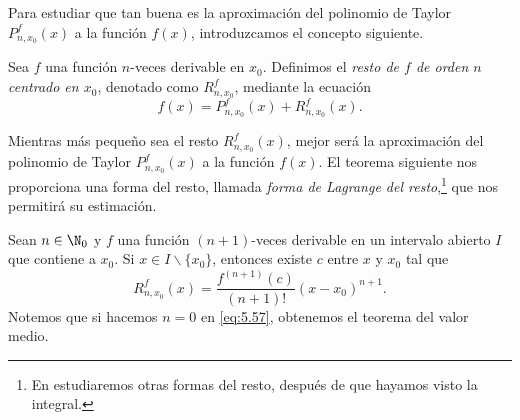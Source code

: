 \documentclass[12pt,a4paper]{book}
\begin{document}
    Para estudiar que tan buena es la aproximación del polinomio de Taylor
    $P^{f}_{n,x_{0}}(x)$ a la función $f(x)$, introduzcamos el concepto siguiente.

    \begin{definicion}[Resto]\label{def:57}
        Sea $f$ una función $n$-veces derivable en $x_{0}$. Definimos
        el \textit{resto de $f$ de orden $n$ centrado en $x_{0}$}, denotado como $R^{f}_{n,x_{0}}$, mediante
        la ecuación
        \begin{equation*}
            f(x)=P^{f}_{n,x_{0}}(x)+R^{f}_{n,x_{0}}(x).
        \end{equation*}
    \end{definicion}

    Mientras más pequeño sea el resto $R^{f}_{n,x_{0}}(x)$, mejor será la aproximación
    del polinomio de Taylor $P^{f}_{n,x_{0}}(x)$ a la función $f(x)$. El teorema siguiente nos
    proporciona una forma del resto, llamada \textit{forma de Lagrange del resto},\footnote{En \cite{nunez2020calculoII} estudiaremos otras formas del resto, después de que hayamos visto la integral.} que
    nos permitirá su estimación.

    \begin{teorema}[de Taylor]\label{teo:9}
        Sean $n\in\N_{0}$ y $f$ una función $(n+1)$-veces derivable
        en un intervalo abierto $I$ que contiene a $x_{0}$. Si $x\in I\backslash\{x_{0}\}$, entonces
        existe $c$ entre $x$ y $x_{0}$ tal que
        \begin{equation}\label{eq:5.57}
            R^{f}_{n,x_{0}}(x)=\frac{f^{(n+1)}(c)}{(n+1)!}(x-x_{0})^{n+1}.
        \end{equation}
        Notemos que si hacemos $n=0$ en \eqref{eq:5.57}, obtenemos el teorema del valor
        medio.
    \end{teorema}
\end{document}
